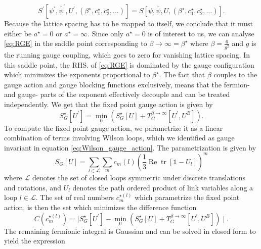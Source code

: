 \documentclass[a4paper,10pt]{book}
\begin{document}
\begin{equation}
S^{\prime}\left[ \psi^{\prime}, \bar{\psi}^{\prime}, U^{\prime}, (\beta^{\star},c_1^{\star},c_2^{\star},\ldots) \right] = S\left[ \psi, \bar{\psi}, U, (\beta^{\star},c_1^{\star},c_2^{\star},\ldots) \right].
\end{equation}
Because the lattice spacing has to be mapped to itself, we conclude that it must either be $a^\star = 0$ or $a^\star = \infty$. Since only $a^\star = 0$ is of interest to us, we can analyse \eqref{eq:RGE} in the saddle point corresponding to $\beta\rightarrow \infty = \beta^\star$ where $\beta = \frac{6}{g^2}$ and $g$ is the running gauge coupling, which goes to zero for vanishing lattice spacing. In this saddle point, the RHS. of \eqref{eq:RGE} is dominated by the gauge configuration which minimizes the exponents proportional to $\beta^\star$. The fact that $\beta$ couples to the gauge action and gauge blocking functions exclusively, means that the fermion- and gauge- parts of the exponent effectively decouple and can be treated independently. We get that the fixed point gauge action is given by
\begin{equation}
S_{G}^{\star}\left[U^{\prime}\right]=\min _{U}\left(S_{G}^{\star}[U]+T_{G}^{\beta\rightarrow\infty}\left[U^{\prime}, U^{B}\right]\right).
\end{equation}
To compute the fixed point gauge action, we parametrize it as a linear combination of terms involving Wilson loops, which we identified as gauge invariant in equation \eqref{eq:Wilson_gauge_action}. The parametrization is given by
\begin{equation}\label{eq:Wilson_parametrized}
S_{G}[U]=\sum_{l \in \mathcal{L}} \sum_{m} c_{m}(l)\left(\frac{1}{3} \operatorname{Re} \operatorname{tr}\left[\mathbb{1}-U_{l}\right]\right)^{m}
\end{equation}
where $\mathcal{L}$ denotes the set of closed loops symmetric under discrete translations and rotations, and $U_l$ denotes the path ordered product of link variables along a loop $l\in\mathcal{L}$. The set of real numbers $c_m^{\star(l)}$ which parametrize the fixed point action, is then the set which minimizes the difference function 
\begin{equation}
C(c_m^{\star(l)})= \mid S_{G}^{\star}\left[U^{\prime}\right]-\min _{U}\left(S_{G}^{\star}[U]+T_{G}^{\beta\rightarrow\infty}\left[U^{\prime}, U^{B}\right]\right)\mid.
\end{equation}
The remaining fermionic integral is Gaussian and can be solved in closed form to yield the expression 
\end{document}
